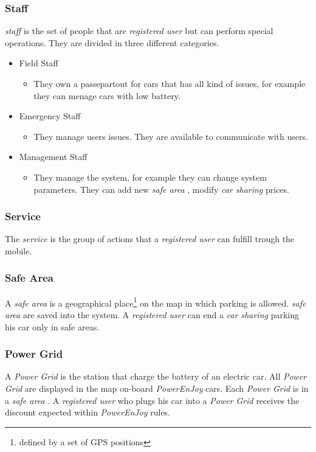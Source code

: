 \documentclass[english]{article}
\newcommand{\carsharing}{\textit {car sharing }}
\newcommand{\powerenjoy}{\textit{PowerEnJoy }}
\newcommand{\registereduser}{\textit {registered user }}
\newcommand{\staff}{\textit{staff }}
\newcommand{\service}{\textit{service }}
\newcommand{\safearea}{\textit{safe area }}
\newcommand{\powergrid}{\textit{Power Grid }}
\newcommand{\powerenjoy}[0]{{PowerEnjoy }}
\begin{document}
		\subsubsection{Staff}
			\staff is the set of people that are \registereduser but can perform special operations. They are divided in three different categories.
			\begin{itemize}
				\item {Field Staff}
				\begin{itemize}
				\item They own a passepartout for cars that has all kind of issues, for example they can menage cars with low battery.
				\end{itemize}
				\item{Emergency Staff}
				\begin{itemize}
				\item They manage users issues. They are available to communicate with users.
				\end{itemize}
				\item{Management Staff}
				\begin{itemize}
				\item They manage the system, for example they can change system parameters. They can add new \safearea, modify \carsharing prices.
				\end{itemize}
			\end{itemize}
		\subsubsection{Service}
			The \service is the group of actions that a \registereduser can fulfill trough the mobile.	
		\subsubsection {Safe Area}
			A \safearea is a  geographical place\footnote{defined by a set of GPS positions} on the map in which parking is allowed. \safearea are saved into the system. A \registereduser can end a \carsharing parking his car only in safe areas.
	\subsubsection{Power Grid}
		A \powergrid is the station that charge the battery of an electric car. All \powergrid are displayed in the map on-board \powerenjoy cars. Each \powergrid is in a \safearea. A \registereduser who plugs his car into a \powergrid receives the discount expected within \powerenjoy rules.
\end{document}
